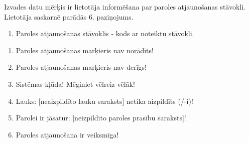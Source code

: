 {
	Izvades datu mērķis ir lietotāja informēšana par paroles atjaunošanas stāvokli. Lietotāja saskarnē parādās 6. paziņojums.
	\begin{enumerate}
		\item Paroles atjaunošanas stāvoklis - kods ar noteiktu stāvokli.
	\end{enumerate}
}
{
	\begin{enumerate}
		\item Paroles atjaunošanas marķieris nav norādīts!
		\item Paroles atjaunošanas marķieris nav derīgs!
		\item Sistēmas kļūda! Mēģiniet vēlreiz vēlāk!
		\item Lauks: [neaizpildīto lauku saraksts] netika aizpildīts (/-i)!
		\item Parolei ir jāsatur: [neizpildīto paroles prasību saraksts]!
		\item Paroles atjaunošana ir veiksmīga!
	\end{enumerate}
}
